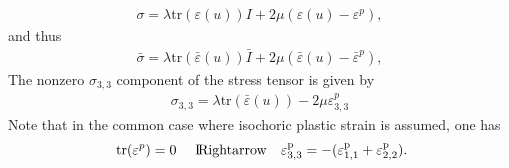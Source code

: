 \documentclass[a4paper,11pt,english]{sphinxmanual}
\begin{document}
\begin{equation*}
\begin{split}\sigma = \lambda \mbox{tr}(\varepsilon(u)) I + 2\mu(\varepsilon(u) - \varepsilon^p),\end{split}
\end{equation*}
and thus
\begin{equation*}
\begin{split}\bar{\sigma} = \lambda \mbox{tr}(\bar{\varepsilon}(u)) \bar{I} + 2\mu(\bar{\varepsilon}(u) -\bar{\varepsilon}^p),\end{split}
\end{equation*}
The nonzero \(\sigma_{3,3}\) component of the stress tensor is given by
\begin{equation*}
\begin{split}\sigma_{3,3} = \lambda \mbox{tr}(\bar{\varepsilon}(u)) - 2\mu \varepsilon^p_{3,3}\end{split}
\end{equation*}
Note that in the common case where isochoric plastic strain is assumed, one has
\begin{equation*}
\begin{split}\mbox{ tr}(\varepsilon^p) = 0 ~~~~ \rm I\hspace{-0.15em}Rightarrow  ~~~ \varepsilon^p_{3,3} = - (\varepsilon^p_{1,1} + \varepsilon^p_{2,2}).\end{split}
\end{equation*}
\end{document}
